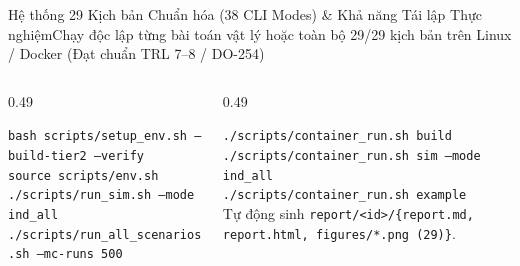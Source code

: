 \documentclass[aspectratio=169,8pt]{beamer}
\begin{document}
\begin{frame}{Hệ thống 29 Kịch bản Chuẩn hóa (38 CLI Modes) \& Khả năng Tái lập Thực nghiệm}{Chạy độc lập từng bài toán vật lý hoặc toàn bộ 29/29 kịch bản trên Linux / Docker (Đạt chuẩn TRL 7--8 / DO-254)}
\vspace{0.14cm}
\begin{columns}[T]
  \begin{column}{0.49\textwidth}
    \begin{eqbox}
      \texttt{bash scripts/setup\_env.sh --build-tier2 --verify}\\
      \texttt{source scripts/env.sh}\\
      \texttt{./scripts/run\_sim.sh --mode ind\_all}\\
      \texttt{./scripts/run\_all\_scenarios.sh --mc-runs 500}
    \end{eqbox}
  \end{column}
  \begin{column}{0.49\textwidth}
    \begin{remarkbox}
      \texttt{./scripts/container\_run.sh build}\\
      \texttt{./scripts/container\_run.sh sim --mode ind\_all}\\
      \texttt{./scripts/container\_run.sh example}\\
      {\scriptsize Tự động sinh \texttt{report/<id>/\{report.md, report.html, figures/*.png (29)\}}.}
    \end{remarkbox}
  \end{column}
\end{columns}
\end{frame}
\end{document}

